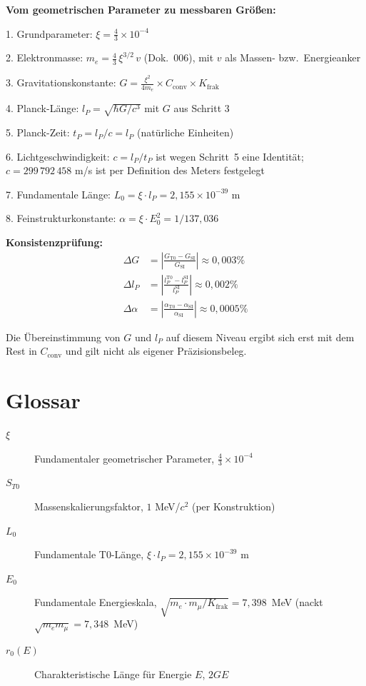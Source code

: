 	\begin{derivation}
		\textbf{Vom geometrischen Parameter zu messbaren Größen:}
		
		1. Grundparameter: $\xi = \frac{4}{3} \times 10^{-4}$
		
		2. Elektronmasse: $m_e = \frac{4}{3}\,\xi^{3/2}\,v$ (Dok.~006), mit $v$ als Massen- bzw.\ Energieanker
		
		3. Gravitationskonstante: $G = \frac{\xi^2}{4m_e} \times C_{\text{conv}} \times K_{\text{frak}}$
		
		4. Planck-Länge: $l_P = \sqrt{\hbar G/c^3}$ mit $G$ aus Schritt 3
		
		5. Planck-Zeit: $t_P = l_P/c = l_P$ (natürliche Einheiten)
		
		6. Lichtgeschwindigkeit: $c = l_P/t_P$ ist wegen Schritt~5 eine Identität; $c = 299\,792\,458$ m/s ist per Definition des Meters festgelegt
		
		7. Fundamentale Länge: $L_0 = \xi \cdot l_P = 2{,}155 \times 10^{-39}$ m
		
		8. Feinstrukturkonstante: $\alpha = \xi \cdot E_0^2 = 1/137{,}036$
		
		\textbf{Konsistenzprüfung:}
		\begin{align}
			\Delta G &= \left|\frac{G_{\text{T0}} - G_{\text{SI}}}{G_{\text{SI}}}\right| \approx 0{,}003\% \\
			\Delta l_P &= \left|\frac{l_P^{\text{T0}} - l_P^{\text{SI}}}{l_P^{\text{SI}}}\right| \approx 0{,}002\% \\
			\Delta \alpha &= \left|\frac{\alpha_{\text{T0}} - \alpha_{\text{SI}}}{\alpha_{\text{SI}}}\right| \approx 0{,}0005\%
		\end{align}
		
		Die Übereinstimmung von $G$ und $l_P$ auf diesem Niveau ergibt sich erst mit dem Rest in $C_{\text{conv}}$ und gilt nicht als eigener Präzisionsbeleg.
		
	\end{derivation}
	
	\section*{Glossar}
	
	\begin{description}
		\item[$\xi$] Fundamentaler geometrischer Parameter, $\frac{4}{3} \times 10^{-4}$
		\item[$S_{T0}$] Massenskalierungsfaktor, $1$ MeV/$c^2$ (per Konstruktion)
		\item[$L_0$] Fundamentale T0-Länge, $\xi \cdot l_P = 2{,}155 \times 10^{-39}$ m
		\item[$E_0$] Fundamentale Energieskala, $\sqrt{m_e \cdot m_\mu/K_{\text{frak}}} = 7{,}398$~MeV (nackt $\sqrt{m_e m_\mu} = 7{,}348$~MeV)
		\item[$r_0(E)$] Charakteristische Länge für Energie $E$, $2GE$
	\end{description}
	
